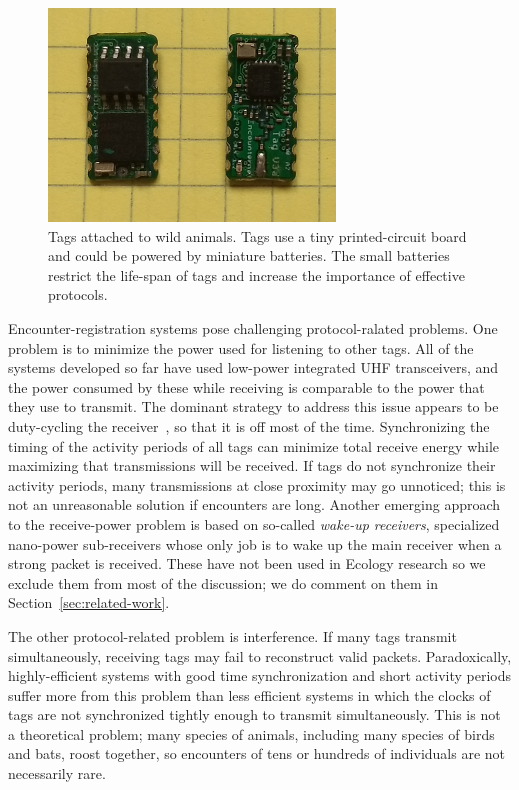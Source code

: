 \begin{figure}[!t]
    \centering
    \includegraphics[width=3in]{figures/tag}
    \caption{Tags attached to wild animals. Tags use a tiny printed-circuit board 
    and could be powered by miniature batteries.
    The small batteries restrict the life-span of tags and increase the importance of effective protocols.}
    \label{tags}
\end{figure}

Encounter-registration systems pose challenging protocol-ralated problems. One problem is to minimize
the power used for listening to other tags. All of the systems developed so far have used low-power integrated
UHF transceivers, and the power consumed by these while receiving is comparable to the power that they use
to transmit. The dominant strategy to address this issue appears to be duty-cycling the 
receiver~\cite{Zhang2017Performance}, so that it is
off most of the time. Synchronizing the timing of the activity periods of all tags can minimize total receive energy
while maximizing that transmissions will be received. If tags do not synchronize their activity periods, many transmissions
at close proximity may go unnoticed; this is not an unreasonable solution if encounters are long. Another emerging approach
to the receive-power problem is based on so-called {\em wake-up receivers}, specialized nano-power sub-receivers whose only
job is to wake up the main receiver when a strong packet is received. These have not been used in Ecology research so we
exclude them from most of the discussion; we do comment on them in Section~\ref{sec:related-work}.

The other protocol-related problem is interference. 
If many tags transmit simultaneously, receiving tags may fail
to reconstruct valid packets. Paradoxically, highly-efficient 
systems with good time synchronization and short activity
periods suffer more from this problem than less efficient systems 
in which the clocks of tags are not synchronized tightly
enough to transmit simultaneously. This is not a theoretical problem; 
many species of animals, including many species of
birds and bats, roost together, so encounters of tens or hundreds 
of individuals are not necessarily rare.

